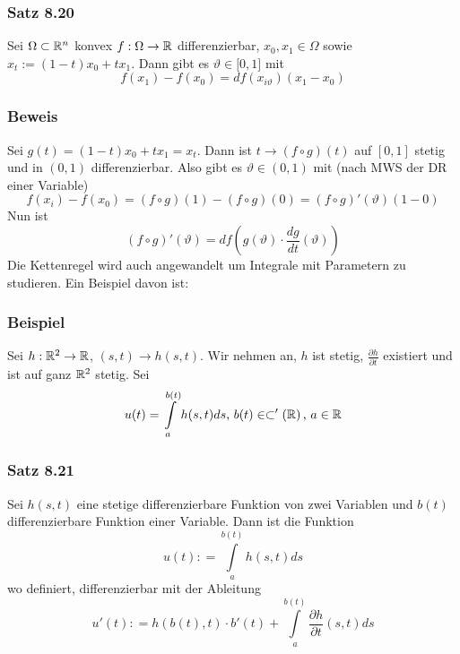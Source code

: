 \subsubsection*{Satz 8.20}
Sei $\Omega\subset\mathbb{R}^n$ konvex $f:\Omega\to\mathbb{R}$ differenzierbar, $x_0,x_1\in\Omega$ sowie $x_t:=\left( 1-t\right) x_0+tx_1$. Dann gibt es $\vartheta\in\lbrack 0,1\rbrack$ mit \[f\left( {{x_1}} \right) - f\left( {{x_0}} \right) = df\left( {{x_{i\vartheta }}} \right)\left( {{x_1} - {x_0}} \right)\]

\subsubsection*{Beweis}
Sei $g\left( t\right) = \left( 1-t\right) x_0+tx_1=x_t$. Dann ist $t\to \left( f\circ g\right)(t)$ auf $\left[ 0,1\right]$ stetig und in $\left( 0,1\right)$ differenzierbar. Also gibt es $\vartheta\in\left( 0,1\right)$ mit (nach MWS der DR einer Variable) \[f\left( {{x_i}} \right) - f\left( {{x_0}} \right) = \left( {f \circ g} \right)(1) - \left( {f \circ g} \right)(0) = \left( {f \circ g} \right)'\left( \vartheta  \right)\left( {1 - 0} \right)\] Nun ist \[\left( {f \circ g} \right)'\left( \vartheta  \right) = df\left( {g\left( \vartheta  \right) \cdot \frac{{dg}}{{dt}}\left( \vartheta  \right)} \right)\] 
Die Kettenregel wird auch angewandelt um Integrale mit Parametern zu studieren. Ein Beispiel davon ist:

\subsubsection*{Beispiel}
Sei $h:\mathbb{R}^2\to\mathbb{R}$, $\left( s,t\right)\to h\left(s,t \right)$. Wir nehmen an, $h$ ist stetig, $\frac{\partial h}{\partial t}$ existiert und ist auf ganz $\mathbb{R}^2$ stetig. Sei
\[u(t) = \int\limits_a^{b(t)} {h(s,t)ds} {\text{, }}b(t) \in\subset '\left( \mathbb{R} \right){\text{, }}a \in\mathbb{R}\]

\subsubsection*{Satz 8.21}
Sei $h(s,t)$ eine stetige differenzierbare Funktion von zwei Variablen und $b(t)$ differenzierbare Funktion einer Variable. Dann ist die Funktion \[u(t): = \int\limits_a^{b(t)} {h(s,t)ds} \] wo definiert, differenzierbar mit der Ableitung \[u'(t): = h\left( {b(t),t} \right) \cdot b'(t) + \int\limits_a^{b(t)} {\frac{{\partial h}}{{\partial t}}\left( {s,t} \right)ds} \]
